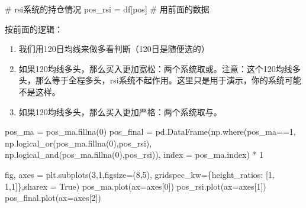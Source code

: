 \documentclass[
  letterpaper,
  DIV=11,
  numbers=noendperiod]{scrreprt}
\newenvironment{Shaded}{\begin{snugshade}}{\end{snugshade}}
\newcommand{\CommentTok}[1]{\textcolor[rgb]{0.37,0.37,0.37}{#1}}
\newcommand{\DecValTok}[1]{\textcolor[rgb]{0.68,0.00,0.00}{#1}}
\newcommand{\NormalTok}[1]{\textcolor[rgb]{0.00,0.23,0.31}{#1}}
\newcommand{\OperatorTok}[1]{\textcolor[rgb]{0.37,0.37,0.37}{#1}}
\newcommand{\StringTok}[1]{\textcolor[rgb]{0.13,0.47,0.30}{#1}}
\newcommand{\VariableTok}[1]{\textcolor[rgb]{0.07,0.07,0.07}{#1}}
\providecommand{\tightlist}{%
  \setlength{\itemsep}{0pt}\setlength{\parskip}{0pt}}\usepackage{longtable,booktabs,array}
\begin{document}
\begin{Shaded}
\begin{Highlighting}[]
\CommentTok{\# rsi系统的持仓情况}
\NormalTok{pos\_rsi }\OperatorTok{=}\NormalTok{ df[}\StringTok{\textquotesingle{}pos\textquotesingle{}}\NormalTok{] }\CommentTok{\# 用前面的数据}
\end{Highlighting}
\end{Shaded}

按前面的逻辑：

\begin{enumerate}
\def\labelenumi{\arabic{enumi}.}
\tightlist
\item
  我们用120日均线来做多看判断（120日是随便选的）
\item
  如果120均线多头，那么买入更加宽松：两个系统取或。注意：这个120均线多头，那么等于全程多头，rsi系统不起作用。这里只是用于演示，你的系统可能不是这样。
\item
  如果120均线多头，那么买入更加严格：两个系统取与。
\end{enumerate}

\begin{Shaded}
\begin{Highlighting}[]
\NormalTok{pos\_ma }\OperatorTok{=}\NormalTok{ pos\_ma.fillna(}\DecValTok{0}\NormalTok{)}
\NormalTok{pos\_final }\OperatorTok{=}\NormalTok{ pd.DataFrame(np.where(pos\_ma}\OperatorTok{==}\DecValTok{1}\NormalTok{,}
\NormalTok{                     np.logical\_or(pos\_ma.fillna(}\DecValTok{0}\NormalTok{),pos\_rsi), }
\NormalTok{                     np.logical\_and(pos\_ma.fillna(}\DecValTok{0}\NormalTok{),pos\_rsi)),}
\NormalTok{                     index }\OperatorTok{=}\NormalTok{ pos\_ma.index) }\OperatorTok{*} \DecValTok{1}
\end{Highlighting}
\end{Shaded}

\begin{Shaded}
\begin{Highlighting}[]
\NormalTok{fig, axes }\OperatorTok{=}\NormalTok{ plt.subplots(}\DecValTok{3}\NormalTok{,}\DecValTok{1}\NormalTok{,figsize}\OperatorTok{=}\NormalTok{(}\DecValTok{8}\NormalTok{,}\DecValTok{5}\NormalTok{), gridspec\_kw}\OperatorTok{=}\NormalTok{\{}\StringTok{\textquotesingle{}height\_ratios\textquotesingle{}}\NormalTok{: [}\DecValTok{1}\NormalTok{, }\DecValTok{1}\NormalTok{,}\DecValTok{1}\NormalTok{]\},sharex }\OperatorTok{=} \VariableTok{True}\NormalTok{)}
\NormalTok{pos\_ma.plot(ax}\OperatorTok{=}\NormalTok{axes[}\DecValTok{0}\NormalTok{])}
\NormalTok{pos\_rsi.plot(ax}\OperatorTok{=}\NormalTok{axes[}\DecValTok{1}\NormalTok{])}
\NormalTok{pos\_final.plot(ax}\OperatorTok{=}\NormalTok{axes[}\DecValTok{2}\NormalTok{])}
\end{Highlighting}
\end{Shaded}
\end{document}

